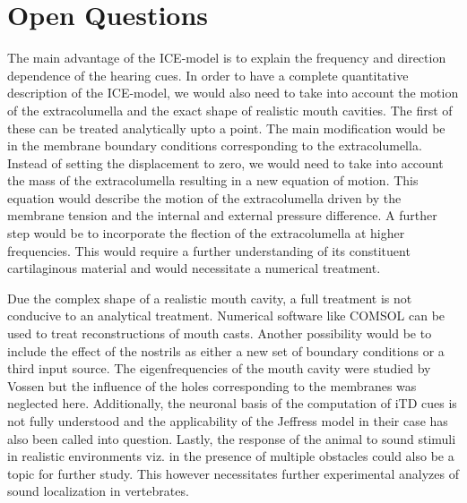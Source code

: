 \section{Open Questions}
The main advantage of the ICE-model is to explain the frequency and direction dependence of the
hearing cues. In order to have a complete quantitative description of the ICE-model, we would also need to take
into account the motion of the extracolumella and the exact shape of realistic mouth cavities. The first of
these can be treated analytically upto a point. The main modification would be in the membrane boundary
conditions corresponding to the extracolumella. Instead of setting the displacement to zero, we would need to take into
account the mass of the extracolumella resulting in a new equation of motion. This equation would describe the motion
of the extracolumella driven by the membrane tension and the internal and external pressure difference. A further step
would be to incorporate the flection of the extracolumella at higher frequencies. This would require a further 
understanding of its constituent cartilaginous material and would necessitate a numerical treatment.

Due the complex shape of a realistic mouth cavity, a full treatment is not conducive to an analytical treatment.
Numerical software like COMSOL can be used to treat reconstructions of mouth casts. Another possibility
would be to include the effect of the nostrils as either a new set of boundary conditions or a third input source. The eigenfrequencies
of the mouth cavity were studied by Vossen but the influence of the holes corresponding to the membranes was neglected here. Additionally,
the neuronal basis of the computation of iTD cues is not fully understood and the applicability of the Jeffress model in their
case has also been called into question. Lastly, the response of the animal to sound stimuli in realistic environments viz. in the presence
of multiple obstacles could also be a topic for further study. This however necessitates further experimental analyzes of sound localization in
vertebrates.